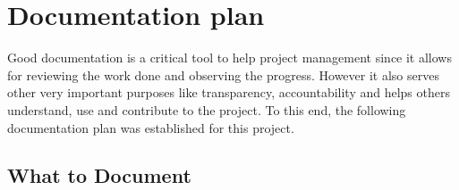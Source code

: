\newpage
\section{Documentation plan}
\label{section:documentation_plan}

Good documentation is a critical tool to help project management since it allows for reviewing the work done and observing the progress. However it also serves other very important purposes like transparency, accountability and helps others understand, use and contribute to the project. To this end, the following documentation plan was established for this project.


\begin{comment}
\helper{Plan for how the project’s documentation is to be managed. Example listed below.}

The purpose of a Documentation Plan is to provide a structured framework for creating, storing, reviewing, and disseminating project-related information. It ensures systematic recording and retention of all details, facilitating efficient communication, transparency, accountability, and continuity throughout the project. Comprehensive documentation is a critical tool in project management, aiding in tracking progress, making informed decisions, and providing references for future initiatives. Furthermore, it promotes knowledge sharing and learning during the project and beyond.

The following sections present a detailed example of a Documentation Plan. It outlines what needs to be documented, how and when to do so, who is responsible for various documentation tasks, where the documents will be stored, and the review and approval process for these documents. This example serves as a guide and should be tailored to fit your project's specific needs and circumstances.
\end{comment}

\subsection{What to Document}

